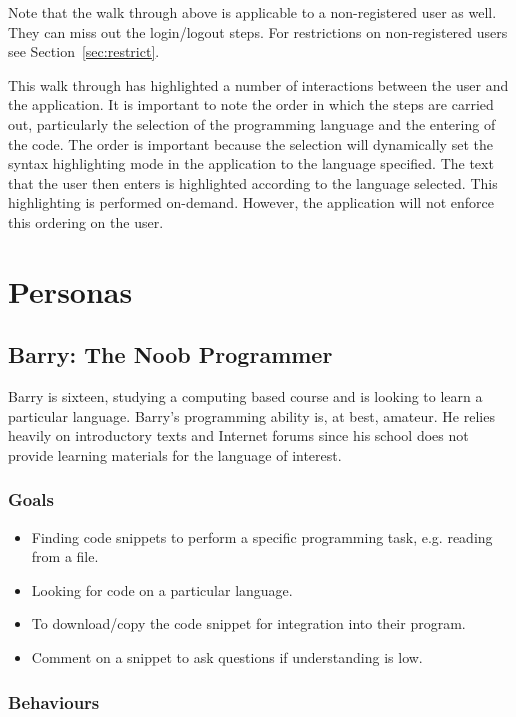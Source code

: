 \documentclass{sig-alt-release2}
\begin{document}
Note that the walk through above is applicable to a non-registered user
as well. They can miss out the login/logout steps. For restrictions on
non-registered users see Section~\ref{sec:restrict}.

This walk through has highlighted a number of interactions between the
user and the application. It is important to note the order in which
the steps are carried out, particularly the selection of the
programming language and the entering of the code. The order is
important because the selection will dynamically set the syntax
highlighting mode in the application to the language specified.
The text that the user then enters is highlighted according to the
language selected. This highlighting is performed on-demand. %
However, the application will not enforce this ordering on the user.

\section{Personas}

\subsection{Barry: The Noob Programmer}
\label{sec:barry} 

Barry is sixteen, studying a computing based course and is looking to
learn a particular language. Barry's programming ability is, at best,
amateur. He relies heavily on introductory texts and Internet forums
since his school does not provide learning materials for the language
of interest.

\subsubsection{Goals}

\begin{itemize}
\item Finding code snippets to perform a specific programming task,
e.g. reading from a file.
\item Looking for code on a particular language.
\item To download/copy the code snippet for integration into their
program.
\item Comment on a snippet to ask questions if understanding is low.
\end{itemize}

\subsubsection{Behaviours}
\end{document}
